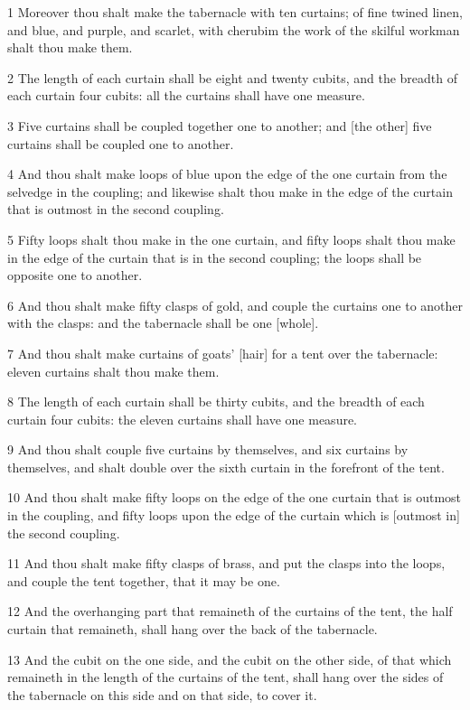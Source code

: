 \par 1 Moreover thou shalt make the tabernacle with ten curtains; of fine twined linen, and blue, and purple, and scarlet, with cherubim the work of the skilful workman shalt thou make them.
\par 2 The length of each curtain shall be eight and twenty cubits, and the breadth of each curtain four cubits: all the curtains shall have one measure.
\par 3 Five curtains shall be coupled together one to another; and [the other] five curtains shall be coupled one to another.
\par 4 And thou shalt make loops of blue upon the edge of the one curtain from the selvedge in the coupling; and likewise shalt thou make in the edge of the curtain that is outmost in the second coupling.
\par 5 Fifty loops shalt thou make in the one curtain, and fifty loops shalt thou make in the edge of the curtain that is in the second coupling; the loops shall be opposite one to another.
\par 6 And thou shalt make fifty clasps of gold, and couple the curtains one to another with the clasps: and the tabernacle shall be one [whole].
\par 7 And thou shalt make curtains of goats' [hair] for a tent over the tabernacle: eleven curtains shalt thou make them.
\par 8 The length of each curtain shall be thirty cubits, and the breadth of each curtain four cubits: the eleven curtains shall have one measure.
\par 9 And thou shalt couple five curtains by themselves, and six curtains by themselves, and shalt double over the sixth curtain in the forefront of the tent.
\par 10 And thou shalt make fifty loops on the edge of the one curtain that is outmost in the coupling, and fifty loops upon the edge of the curtain which is [outmost in] the second coupling.
\par 11 And thou shalt make fifty clasps of brass, and put the clasps into the loops, and couple the tent together, that it may be one.
\par 12 And the overhanging part that remaineth of the curtains of the tent, the half curtain that remaineth, shall hang over the back of the tabernacle.
\par 13 And the cubit on the one side, and the cubit on the other side, of that which remaineth in the length of the curtains of the tent, shall hang over the sides of the tabernacle on this side and on that side, to cover it.

